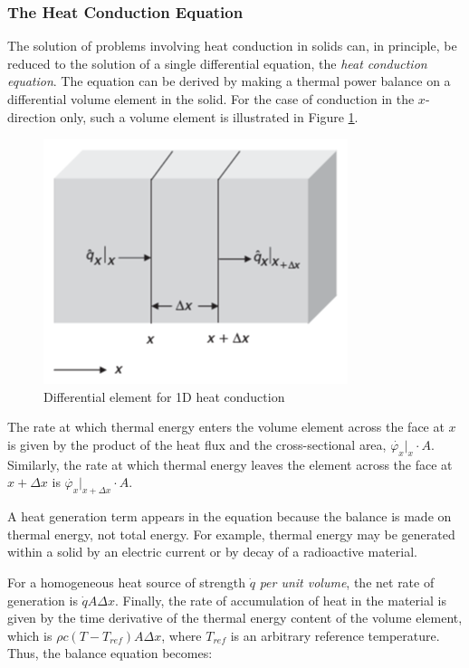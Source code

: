 \subsubsection{The Heat Conduction Equation}

The solution of problems involving heat conduction in solids can, in principle, be reduced to the
solution of a single differential equation, the \emph{heat conduction equation}. The equation can be derived
by making a thermal power balance on a differential volume element in the solid. For the case of
conduction in the $x$-direction only, such a volume element is illustrated in Figure \ref{fig:element_1d}. 

\begin{figure}[H]
	\centering
	\includegraphics[width=0.5\columnwidth]{Pictures/Element.png}
	\caption[Short title]{Differential element for 1D heat conduction}
	\label{fig:element_1d}
\end{figure}

The rate at which thermal energy enters the volume element across the face at $x$ is given by the
product of the heat flux and the cross-sectional area, $\dot{\varphi_x}|_x \cdot A$.
Similarly, the rate at which thermal energy leaves the element across the face at $x + \Delta x$ is $\dot{\varphi_x}|_{x + \Delta x} \cdot A$. 

A heat generation term appears in the equation because the balance is made on thermal energy, not
total energy. For example, thermal energy may be generated within a solid by an electric current
or by decay of a radioactive material.

For a homogeneous heat source of strength $\dot{q}$ \emph{per unit volume}, the net rate of generation is $\dot{q}A \Delta x$. Finally, the rate of accumulation of heat in the material is given by the time derivative of the thermal energy content of the volume element, which is $\rho c(T - T_{ref} )A\Delta x$, where $T_{ref}$ is an arbitrary reference temperature. Thus, the balance equation
becomes:

